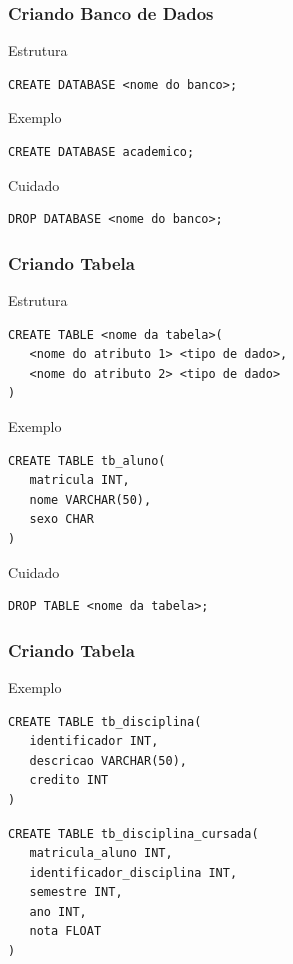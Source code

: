 \documentclass{beamer}
\begin{document}
\begin{frame}[fragile]
\frametitle{Criando Banco de Dados}

\begin{block}{Estrutura}
\begin{lstlisting}
CREATE DATABASE <nome do banco>;
\end{lstlisting}
\end{block}\vfill

\begin{exampleblock}{Exemplo}
\begin{lstlisting}
CREATE DATABASE academico;
\end{lstlisting}
\end{exampleblock}\vfill

\begin{alertblock}{Cuidado}
	\begin{lstlisting}
DROP DATABASE <nome do banco>;
	\end{lstlisting}
\end{alertblock}
\end{frame}

\begin{frame}[fragile]
\frametitle{Criando Tabela}

\begin{block}{Estrutura}
\begin{lstlisting}
CREATE TABLE <nome da tabela>(
   <nome do atributo 1> <tipo de dado>,
   <nome do atributo 2> <tipo de dado>
)
\end{lstlisting}
\end{block}\vfill

\begin{exampleblock}{Exemplo}
\begin{lstlisting}
CREATE TABLE tb_aluno(
   matricula INT,
   nome VARCHAR(50),
   sexo CHAR
)
\end{lstlisting}
\end{exampleblock}\vfill

\begin{alertblock}{Cuidado}
	\begin{lstlisting}
DROP TABLE <nome da tabela>;
	\end{lstlisting}
\end{alertblock}
\end{frame}

\begin{frame}[fragile]
\frametitle{Criando Tabela}

\begin{exampleblock}{Exemplo}
\begin{lstlisting}
CREATE TABLE tb_disciplina(
   identificador INT,
   descricao VARCHAR(50),
   credito INT
)	
\end{lstlisting}\vfill

\begin{lstlisting}
CREATE TABLE tb_disciplina_cursada(
   matricula_aluno INT,
   identificador_disciplina INT,
   semestre INT,
   ano INT,
   nota FLOAT
)	
\end{lstlisting}
\end{exampleblock}
\end{frame}
\end{document}
